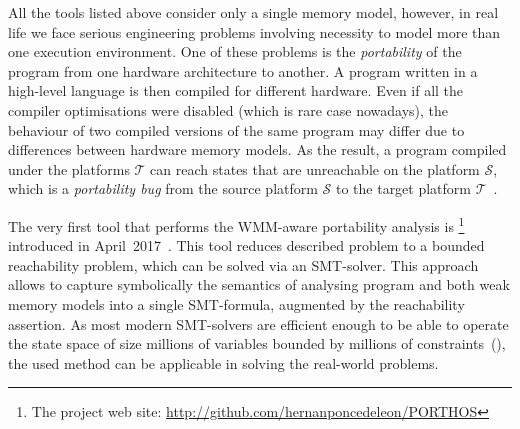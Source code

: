 
All the tools listed above consider only a single memory model, however, in real life we face serious engineering problems involving necessity to model more than one execution environment.
One of these problems is the \textit{portability} of the program from one hardware architecture to another.
A program written in a high-level language is then compiled for different hardware.
Even if all the compiler optimisations were disabled (which is rare case nowadays), the behaviour of two compiled versions of the same program may differ due to differences between hardware memory models.
As the result, a program compiled under the platforms $\mathcal{T}$ can reach states that are unreachable on the platform $\mathcal{S}$, which is a \textit{portability bug} from the source platform $\mathcal{S}$ to the target platform $\mathcal{T}$~\cite{Porthos17a}.

The very first tool that performs the WMM-aware portability analysis is \porthos%
%
\footnote{The \porthos{} project web site: \url{http://github.com/hernanponcedeleon/PORTHOS}} %
%
introduced in April~2017~\cite{Porthos17b}.
This tool reduces described problem to a bounded reachability problem, which can be solved via an SMT-solver.
This approach allows to capture symbolically the semantics of analysing program and both weak memory models into a single SMT-formula, augmented by the reachability assertion.
As most modern SMT-solvers are efficient enough to be able to operate the state space of size millions of variables bounded by millions of constraints~(\cite{malik2009boolean}), the used method can be applicable in solving the real-world problems.


